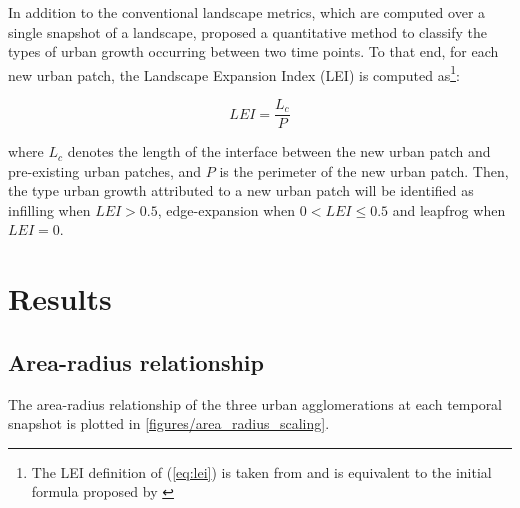 In addition to the conventional landscape metrics, which are computed over a single snapshot of a landscape, \cite{liu2010new} proposed a quantitative method to classify the types of urban growth occurring between two time points. 
To that end, for each new urban patch, the Landscape Expansion Index (LEI) is computed as\footnote{The LEI definition of (\ref{eq:lei}) is taken from \cite{nong2018quantifying} and is equivalent to the initial formula proposed by \cite{liu2010new}}:

\begin{equation}
  \label{eq:lei}
  LEI = \frac{L_c}{P}
\end{equation}

where $L_c$ denotes the length of the interface between the new urban patch and pre-existing urban patches, and $P$ is the perimeter of the new urban patch. Then, the type urban growth attributed to a new urban patch will be identified as infilling when $LEI > 0.5$, edge-expansion when $0 < LEI \leq 0.5$ and leapfrog when $LEI = 0$.



\section*{Results}

\subsection*{Area-radius relationship}

The area-radius relationship of the three urban agglomerations at each temporal snapshot is plotted in \autoref{figures/area_radius_scaling}.

